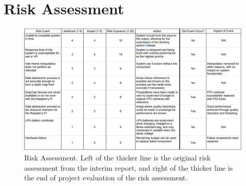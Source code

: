 \chapter{Risk Assessment}
\label{appendix:risk}

\begin{landscape}
\begin{figure}[ht]
    \begin{center}
      \includegraphics[width=1.5\textwidth]{Figures/risk.png}
      \caption[Risk Assessment]{Risk Assessment. Left of the thicker line is the original risk assessment from the interim report, and right of the thicker line is the end of project evaluation of the risk assessment.}
      \label{fig:Risk}
    \end{center}
\end{figure}
\end{landscape}